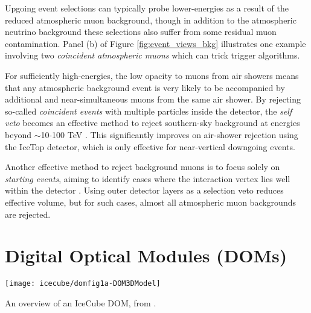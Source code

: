 Upgoing event selections can typically probe lower-energies as a result of the reduced atmospheric muon background, though in addition to the atmospheric neutrino background these selections also suffer from some residual muon contamination. Panel (b) of Figure \ref{fig:event_views_bkg} illustrates one example involving two \emph{coincident atmospheric muons} which can trick trigger algorithms.


For sufficiently high-energies, the low opacity to muons from air showers means that any atmospheric background event is very likely to be accompanied by additional and near-simultaneous muons from the same air shower. By rejecting so-called \emph{coincident events} with multiple particles inside the detector, the \emph{self veto} becomes an effective method to reject southern-sky background at energies beyond $\sim$10-100 TeV . This significantly improves on air-shower rejection using the IceTop detector, which is only effective for near-vertical downgoing events.

Another effective method to reject background muons is to focus solely on \emph{starting events}, aiming to identify cases where the interaction vertex lies well within the detector . Using outer detector layers as a selection veto reduces effective volume, but for such cases, almost all atmospheric muon backgrounds are rejected. 


\section{Digital Optical Modules (DOMs)}

\begin{marginfigure}
	\centering \texttt{[image: icecube/domfig1a-DOM3DModel]}
	\caption{An overview of an IceCube DOM, from \cite{icecube_detector_17}.}
	\label{fig:dom}
\end{marginfigure} 

